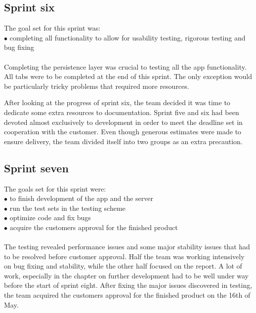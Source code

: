 \subsection{Sprint six}
The goal set for this sprint was:\\
$\bullet$\hspace{0.25cm} completing all functionality to allow for usability testing, rigorous testing and bug fixing\\\\
Completing the persistence layer was crucial to testing all the app functionality. All tabs were to be completed at the end of this sprint. The only exception would be particularly tricky problems that required more resources.

After looking at the progress of sprint six, the team decided it was time to dedicate some extra resources to documentation. Sprint five and six had been devoted almost exclusively to development in order to meet the deadline set in cooperation with the customer. Even though generous estimates were made to ensure delivery, the team divided itself into two groups as an extra precaution. 

\subsection{Sprint seven}
The goals set for this sprint were:\\
$\bullet$\hspace{0.25cm} to finish development of the app and the server\\
$\bullet$\hspace{0.25cm} run the test sets in the testing scheme\\
$\bullet$\hspace{0.25cm} optimize code and fix bugs\\
$\bullet$\hspace{0.25cm} acquire the customers approval for the finished product\\\\
The testing revealed performance issues and some major stability issues that had to be resolved before customer approval. Half the team was working intensively on bug fixing and stability, while the other half focused on the report. A lot of work, especially in the chapter on further development had to be well under way before the start of sprint eight. After fixing the major issues discovered in testing, the team acquired the customers approval for the finished product on the 16th of May.

